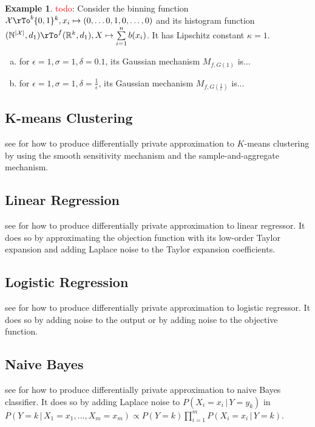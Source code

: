 \documentclass[12pt]{amsart}
\theoremstyle{definition}
\newtheorem{example}[theorem]{Example}
\begin{document}
\begin{example} \label{Gaussian_mechanism_histogram_function} \textcolor{red}{todo}: Consider the binning function $\mathcal{X} \rTo^b \{0, 1\}^k, x_i \mapsto (0, \dots 0, 1, 0, \dots , 0)$ and its histogram function $(\mathbb{N}^{|\mathcal{X}|}, d_1) \rTo^f (\mathbb{R}^k, d_1), X \mapsto \sum\limits_{i = 1}^n b(x_i)$. It has Lipschitz constant $\kappa = 1$.
\begin{enumerate}[a.]
\item for $\epsilon = 1, \sigma = 1, \delta = 0.1$, its Gaussian mechanism $M_{f, G(1)}$ is...
\item for $\epsilon = 1, \sigma = 1, \delta = \frac{1}{\epsilon}$, its Gaussian mechanism $M_{f, G(\frac{1}{\epsilon})}$ is...
\end{enumerate}
\end{example}

\subsection{K-means Clustering} see \cite{k_means_clustering} for how to produce differentially private approximation to $K$-means clustering by using the smooth sensitivity mechanism and the sample-and-aggregate mechanism.

\subsection{Linear Regression} see \cite{linear_regression} for how to produce differentially private approximation to linear regressor. It does so by approximating the objection function with its low-order Taylor expansion and adding Laplace noise to the Taylor expansion coefficients.

\subsection{Logistic Regression} see \cite{logistic_regression} for how to produce differentially private approximation to logistic regressor. It does so by adding noise to the output or by adding noise to the objective function.

\subsection{Naive Bayes} see \cite{naive_bayes_classification} for how to produce differentially private approximation to naive Bayes classifier. It does so by adding Laplace noise to $P(X_i = x_i \,|\, Y = y_k)$ in $P(Y = k \,|\, X_1 = x_1, \dots , X_m = x_m) \propto P(Y = k) \prod\limits_{i = 1}^m P(X_i = x_i \,|\, Y = k)$.
\end{document}
